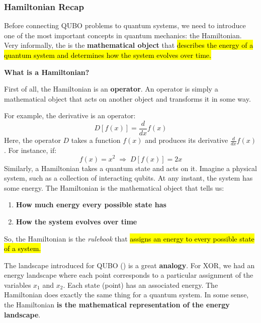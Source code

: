 \subsubsection{Hamiltonian Recap}\label{sec:hamiltonian-recap}

Before connecting QUBO problems to quantum systems, we need to introduce one of the most important concepts in quantum mechanics: the Hamiltonian. Very informally, the  is the \textbf{mathematical object} that \hl{describes the energy of a quantum system and determines how the system evolves over time.}

\highspace
\begin{flushleft}
    \textcolor{Green3}{ \textbf{What is a Hamiltonian?}}
\end{flushleft}
First of all, the Hamiltonian is an \textbf{operator}. An operator is simply a mathematical object that acts on another object and transforms it in some way.

\highspace
For example, the derivative is an operator:
\begin{equation*}
    D\left[f(x)\right] = \frac{d}{dx} f(x)
\end{equation*}
Here, the operator $D$ takes a function $f(x)$ and produces its derivative $\frac{d}{dx} f(x)$. For instance, if:
\begin{equation*}
    f(x) = x^2 \; \Rightarrow \; D\left[f(x)\right] = 2x
\end{equation*}
Similarly, a Hamiltonian takes a quantum state and acts on it. Imagine a physical system, such as a collection of interacting qubits. At any instant, the system has some energy. The Hamiltonian is the mathematical object that tells us:
\begin{enumerate}
    \item \textbf{How much energy every possible state has}
    \item \textbf{How the system evolves over time}
\end{enumerate}
So, the Hamiltonian is the \emph{rulebook} that \hl{assigns an energy to every possible state of a system.}

\highspace
The landscape introduced for QUBO () is a great \textbf{analogy}. For XOR, we had an energy landscape where each point corresponds to a particular assignment of the variables $x_1$ and $x_2$. Each state (point) has an associated energy. The Hamiltonian does exactly the same thing for a quantum system. In some sense, the Hamiltonian \textbf{is the mathematical representation of the energy landscape}.

